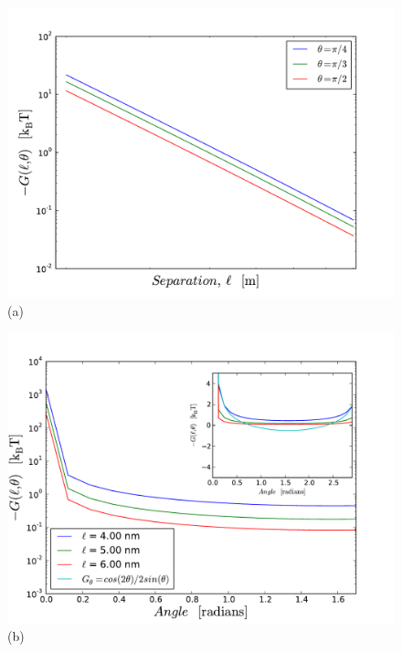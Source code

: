 \documentclass[onecolumn,letterpaper,amsmath,amssymb,floatfix,aps,superscriptaddress]{revtex4}
\begin{document}
\begin{figure}[t!]
\begin{center}
\begin{minipage}[b]{0.40\textwidth}
\begin{center}
\includegraphics[width=1.2\textwidth]{./140220_cyl-cyl/Full_skew_G_vs_l.pdf} (a)
\end{center}
\end{minipage}
\hskip 43pt
\begin{minipage}[b]{0.40\textwidth}
\begin{center}
\includegraphics[width=1.2\textwidth]{./140220_cyl-cyl/Full_skew_G_vs_theta.pdf} (b)

\end{center}
\end{minipage}
\end{center}
\end{figure}
\end{document}
